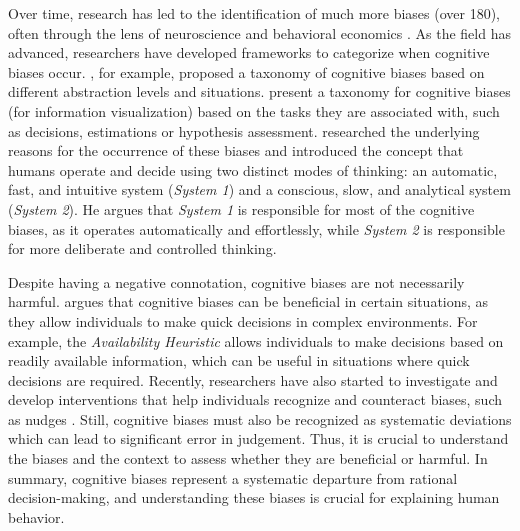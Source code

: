 \par Over time, research has led to the identification of much more biases (over 180), often through the lens of neuroscience and behavioral economics \parencite{azzopardi2021cognitive}. As the field has advanced, researchers have developed frameworks to categorize when cognitive biases occur. \textcite{arnott1998taxonomy}, for example, proposed a taxonomy of cognitive biases based on different abstraction levels and situations. \textcite{dimara2018task} present a taxonomy for cognitive biases (for information visualization) based on the tasks they are associated with, such as decisions, estimations or hypothesis assessment. \textcite{kahneman2017thinking} researched the underlying reasons for the occurrence of these biases and introduced the concept that humans operate and decide using two distinct modes of thinking: an automatic, fast, and intuitive system (\textit{System 1}) and a conscious, slow, and analytical system (\textit{System 2}). He argues that \textit{System 1} is responsible for most of the cognitive biases, as it operates automatically and effortlessly, while \textit{System 2} is responsible for more deliberate and controlled thinking.

\par Despite having a negative connotation, cognitive biases are not necessarily harmful. \textcite{gigerenzer2007gut} argues that cognitive biases can be beneficial in certain situations, as they allow individuals to make quick decisions in complex environments. For example, the \textit{Availability Heuristic} allows individuals to make decisions based on readily available information, which can be useful in situations where quick decisions are required. Recently, researchers have also started to investigate and develop interventions that help individuals recognize and counteract biases, such as nudges \parencite{thaler2008nudge}. Still, cognitive biases must also be recognized as systematic deviations which can lead to significant error in judgement. Thus, it is crucial to understand the biases and the context to assess whether they are beneficial or harmful. In summary, cognitive biases represent a systematic departure from rational decision-making, and understanding these biases is crucial for explaining human behavior.


